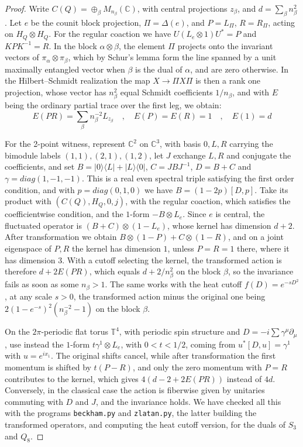 \documentclass[11pt]{amsart}
\theoremstyle{definition}
\begin{document}
\begin{proof}
Write $C(Q)=\oplus_\beta M_{n_\beta}(\mathbb C)$, with central projections $z_\beta$, and $d=\sum_\beta n_\beta^2$. Let $e$ be the counit block projection, $\Pi=\Delta(e)$, and $P=L_\Pi$, $R=R_\Pi$, acting on $H_Q\otimes H_Q$. For the regular coaction we have $U(L_e\otimes1)U^*=P$ and $KPK^{-1}=R$. In the block $\alpha\otimes\beta$, the element $\Pi$ projects onto the invariant vectors of $\pi_\alpha\otimes\pi_\beta$, which by Schur's lemma form the line spanned by a unit maximally entangled vector when $\beta$ is the dual of $\alpha$, and are zero otherwise. In the Hilbert--Schmidt realization the map $X\to\Pi X\Pi$ is then a rank one projection, whose vector has $n_\beta^2$ equal Schmidt coefficients $1/n_\beta$, and with $E$ being the ordinary partial trace over the first leg, we obtain:
$$E(PR)=\sum_\beta n_\beta^{-2}L_{z_\beta}\quad,\quad E(P)=E(R)=1\quad,\quad E(1)=d$$

For the 2-point witness, represent $\mathbb C^2$ on $\mathbb C^3$, with basis $0,L,R$ carrying the bimodule labels $(1,1),(2,1),(1,2)$, let $J$ exchange $L,R$ and conjugate the coefficients, and set $B=|0\rangle\langle L|+|L\rangle\langle0|$, $C=JBJ^{-1}$, $D=B+C$ and $\gamma=diag(1,-1,-1)$. This is a real even spectral triple satisfying the first order condition, and with $p=diag(0,1,0)$ we have $B=(1-2p)[D,p]$. Take its product with $(C(Q),H_Q,0,j)$, with the regular coaction, which satisfies the coefficientwise condition, and the $1$-form $-B\otimes L_e$. Since $e$ is central, the fluctuated operator is $(B+C)\otimes(1-L_e)$, whose kernel has dimension $d+2$. After transformation we obtain $B\otimes(1-P)+C\otimes(1-R)$, and on a joint eigenspace of $P,R$ the kernel has dimension $1$, unless $P=R=1$ there, where it has dimension $3$. With a cutoff selecting the kernel, the transformed action is therefore $d+2E(PR)$, which equals $d+2/n_\beta^2$ on the block $\beta$, so the invariance fails as soon as some $n_\beta>1$. The same works with the heat cutoff $f(D)=e^{-sD^2}$, at any scale $s>0$, the transformed action minus the original one being $2(1-e^{-s})^2(n_\beta^{-2}-1)$ on the block $\beta$.

On the $2\pi$-periodic flat torus $\mathbb T^4$, with periodic spin structure and $D=-i\sum\gamma^\mu\partial_\mu$, use instead the $1$-form $t\gamma^1\otimes L_e$, with $0<t<1/2$, coming from $u^*[D,u]=\gamma^1$ with $u=e^{ix_1}$. The original shifts cancel, while after transformation the first momentum is shifted by $t(P-R)$, and only the zero momentum with $P=R$ contributes to the kernel, which gives $4(d-2+2E(PR))$ instead of $4d$. Conversely, in the classical case the action is fiberwise given by unitaries commuting with $D$ and $J$, and the invariance holds. We have checked all this with the programs {\tt beckham.py} and {\tt zlatan.py}, the latter building the transformed operators, and computing the heat cutoff version, for the duals of $S_3$ and $Q_8$.
\end{proof}
\end{document}
